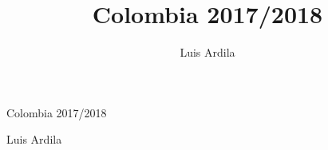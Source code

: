\documentclass[10pt,final,openany]{book}
\title{Colombia 2017/2018}
\author{Luis Ardila}
\begin{document}
\pagestyle{empty}

\vspace*{3in}

\begin{center}

{\Huge Colombia 2017/2018}

\vspace{\baselineskip}

{\Large Luis Ardila }

\end{center}

\newpage
\thispagestyle{empty}
\mbox{}

\addtocounter{page}{-2}%

\pagestyle{plain}

\captionsetup[figure]{labelformat=empty}

\newpage


\end{document}
